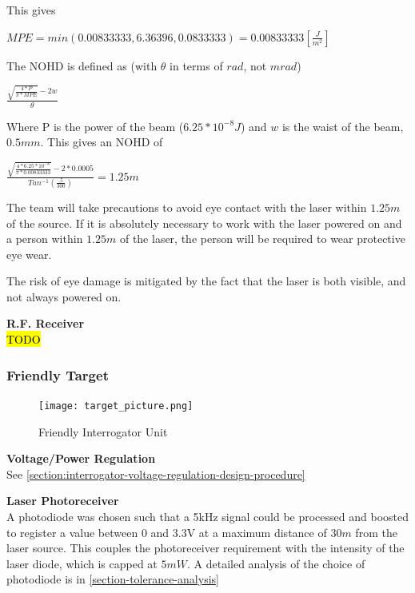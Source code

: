 \documentclass[letterpaper,10pt]{article}
\begin{document}
\begin{spacing}{1.15}
 This gives 
 \begin{center}
 	\large
 	$MPE = min(0.00833333, 6.36396, 0.0833333) = 0.00833333 [\frac{J}{m^2}]$
 \end{center}
 
 The NOHD is defined as (with $\theta$ in terms of $rad$, not $mrad$)
 \begin{center}
 	\large
 	$ \frac{\sqrt{\frac{4 * P}{\pi * MPE}} - 2w}{\theta}$
 \end{center}
 
 Where P is the power of the beam ($6.25*10^{-8} J$) and $w$ is the waist of the beam, $0.5mm$. This gives an NOHD of 
 \begin{center}
 	\large
 	$ \frac{\sqrt{\frac{4 * 6.25*10^{-8} }{\pi * 0.00833333}} - 2*0.0005}{Tan^{-1}(\frac{.5}{300})} = 1.25 m$
 \end{center}
 
 The team will take precautions to avoid eye contact with the laser within $1.25m$ of the source. If it is absolutely necessary to work with the laser powered on and a person within $1.25m$ of the laser, the person will be required to wear protective eye wear. 
 
 The risk of eye damage is mitigated by the fact that the laser is both visible, and not always powered on. 


\hspace{5mm}\textbf{R.F. Receiver} \label{section:rf-receiver-design-procedure}
\\ \hl{TODO}

\subsubsection{Friendly Target}


\begin{figure} [H]
	\centering
	\texttt{[image: target\_picture.png]}
	\caption{Friendly Interrogator Unit\label{fig:threshold}}
\end{figure}

\hspace{5mm}\textbf{Voltage/Power Regulation} \label{section:target-voltage-regulation-design-procedure} \\
See \ref{section:interrogator-voltage-regulation-design-procedure}

\hspace{5mm}\textbf{Laser Photoreceiver} \label{section:laser-photoreceiver-design-procedure}\\
A photodiode was chosen such that a 5kHz signal could be processed and boosted to register a value between 0 and 3.3V at a maximum distance of $30m$ from the laser source. This couples the photoreceiver requirement with the intensity of the laser diode, which is capped at $5 mW$. A detailed analysis of the choice of photodiode is in \ref{section-tolerance-analysis}




\end{spacing}
\end{document}
